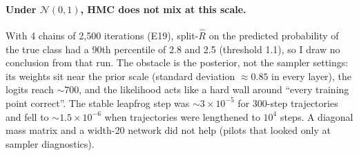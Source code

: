 \documentclass[11pt]{article}
\begin{document}
\paragraph{Under $\mathcal N(0,1)$, HMC does not mix at this scale.} With
4 chains of 2{,}500 iterations (E19), split-$\hat R$ on the predicted
probability of the true class had a 90th percentile of 2.8 and 2.5
(threshold 1.1), so I draw no conclusion from that run. The obstacle is the
posterior, not the sampler settings: its weights sit near the prior scale
(standard deviation $\approx0.85$ in every layer), the logits reach $\sim$700,
and the likelihood acts like a hard wall around ``every training point
correct''. The stable leapfrog step was $\sim3\times10^{-5}$ for 300-step
trajectories and fell to $\sim1.5\times10^{-6}$ when trajectories were
lengthened to $10^4$ steps. A diagonal mass matrix and a width-20 network did
not help (pilots that looked only at sampler diagnostics).
\end{document}
